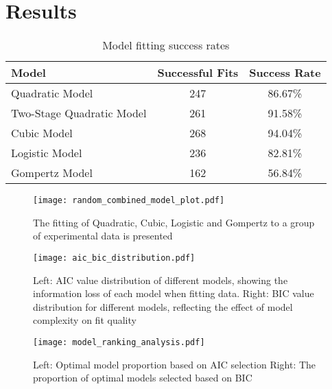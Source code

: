 \documentclass[11pt]{article}
\begin{document}
\section{Results}

\begin{table}[h]
    \centering
    \begin{tabular}{lcc}
        \hline
        \textbf{Model} & \textbf{Successful Fits} & \textbf{Success Rate} \\
        \hline
        Quadratic Model & 247 & 86.67\% \\
        Two-Stage Quadratic Model & 261 & 91.58\% \\
        Cubic Model & 268 & 94.04\% \\
        Logistic Model & 236 & 82.81\% \\
        Gompertz Model & 162 & 56.84\% \\
        \hline
    \end{tabular}
    \caption{Model fitting success rates}
\end{table}

\begin{figure}[h]
    \centering
    \texttt{[image: random\_combined\_model\_plot.pdf]}
    \caption{The fitting of Quadratic, Cubic, Logistic and Gompertz to a group of experimental data is presented}
    \label{fig:enter-label}
\end{figure}
\begin{figure}[h]
    \centering
    \texttt{[image: aic\_bic\_distribution.pdf]}
    \caption{Left: AIC value distribution of different models, showing the information loss of each model when fitting data.
Right: BIC value distribution for different models, reflecting the effect of model complexity on fit quality}
    \label{fig:enter-label}
\end{figure}
\begin{figure}[h]
    \centering
    \texttt{[image: model\_ranking\_analysis.pdf]}
    \caption{Left: Optimal model proportion based on AIC selection
Right: The proportion of optimal models selected based on BIC}
    \label{fig:enter-label}
\end{figure}
\FloatBarrier  %
\end{document}
